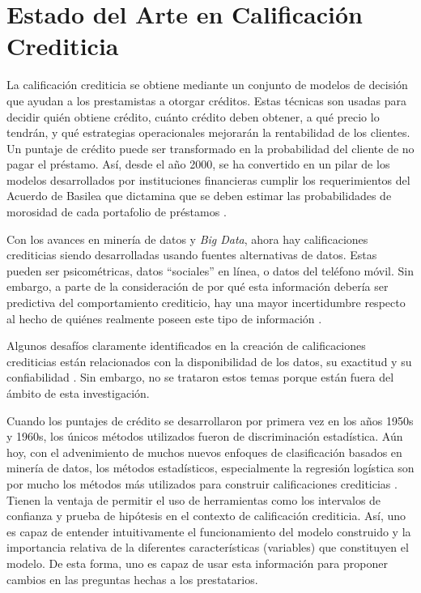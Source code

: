 \chapter{Estado del Arte en Calificación Crediticia}

La calificación crediticia se obtiene mediante un conjunto de modelos de decisión que ayudan a los prestamistas a otorgar créditos. Estas técnicas son usadas para decidir quién obtiene crédito, cuánto crédito deben obtener, a qué precio lo tendrán, y qué estrategias operacionales mejorarán la rentabilidad de los clientes. Un puntaje de crédito puede ser transformado en la probabilidad del cliente de no pagar el préstamo. Así, desde el año 2000, se ha convertido en un pilar de los modelos desarrollados por instituciones financieras cumplir los requerimientos del Acuerdo de Basilea que dictamina que se deben estimar las probabilidades de morosidad de cada portafolio de préstamos \citep[1]{thomas2017credit}.

Con los avances en minería de datos y \textit{Big Data}, ahora hay calificaciones crediticias siendo desarrolladas usando fuentes alternativas de datos. Estas pueden ser psicométricas, datos ``sociales'' en línea, o datos del teléfono móvil. Sin embargo, a parte de la consideración de por qué esta información debería ser predictiva del comportamiento crediticio, hay una mayor incertidumbre respecto al hecho de quiénes realmente poseen este tipo de información \citep[18]{thomas2017credit}.

Algunos desafíos claramente identificados en la creación de calificaciones crediticias están relacionados con la disponibilidad de los datos, su exactitud y su confiabilidad \citep[18--19]{thomas2017credit}. Sin embargo, no se trataron estos temas porque están fuera del ámbito de esta investigación.

Cuando los puntajes de crédito se desarrollaron por primera vez en los años 1950s y 1960s, los únicos métodos utilizados fueron de discriminación estadística. Aún hoy, con el advenimiento de muchos nuevos enfoques de clasificación basados en minería de datos, los métodos estadísticos, especialmente la regresión logística son por mucho los métodos más utilizados para construir calificaciones crediticias \citep[25]{thomas2017credit}. Tienen la ventaja de permitir el uso de herramientas como los intervalos de confianza y prueba de hipótesis en el contexto de calificación crediticia. Así, uno es capaz de entender intuitivamente el funcionamiento del modelo construido y la importancia relativa de la diferentes características (variables) que constituyen el modelo. De esta forma, uno es capaz de usar esta información para proponer cambios en las preguntas hechas a los prestatarios.

